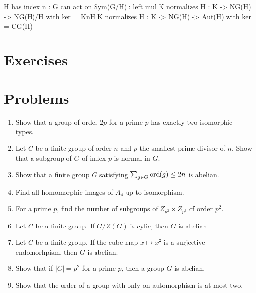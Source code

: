 \documentclass{../../large}
\begin{document}
\begin{prb}
\end{prb}

\begin{prb}
\end{prb}

H has index n  : G can act on Sym(G/H) : left mul
K normalizes H : K -> NG(H) -> NG(H)/H  with ker = KnH
K normalizes H : K -> NG(H) -> Aut(H)  with ker = CG(H)







\section*{Exercises}

\section*{Problems}

\begin{enumerate}
\item Show that a group of order $2p$ for a prime $p$ has exactly two isomorphic types.
\item Let $G$ be a finite group of order $n$ and $p$ the smallest prime divisor of $n$. Show that a subgroup of $G$ of index $p$ is normal in $G$.
\item Show that a finite group $G$ satisfying $\sum_{g\in G}\operatorname{ord}(g)\le2n$ is abelian.
\item Find all homomorphic images of $A_4$ up to isomorphism.
\item For a prime $p$, find the number of subgroups of $Z_{p^2}\times Z_{p^3}$ of order $p^2$.
\item Let $G$ be a finite group. If $G/Z(G)$ is cylic, then $G$ is abelian.
\item Let $G$ be a finite group. If the cube map $x\mapsto x^3$ is a surjective endomorhpism, then $G$ is abelian.
\item Show that if $|G|=p^2$ for a prime $p$, then a group $G$ is abelian.
\item Show that the order of a group with only on automorphism is at most two.
\end{enumerate}
\end{document}

